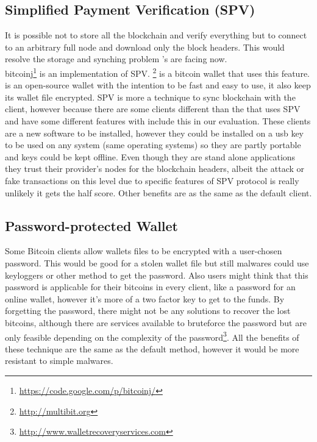 \subsection{Simplified Payment Verification (SPV)}
It is possible not to store all the blockchain and verify everything but to connect to an arbitrary full node and download only the block headers. This would resolve the storage and synching problem \bitcoinclient's are facing now. \\
bitcoinj\footnote{\url {https://code.google.com/p/bitcoinj/}} is an implementation of SPV.
 \multibit \footnote{\url {http://multibit.org}} is a bitcoin wallet that uses this feature. \multibit is an open-source wallet with the intention to be fast and easy to use, it also keep its wallet file encrypted.
SPV is more a technique to sync blockchain with the client, however because there are some clients different than the \bitcoinclient that uses SPV and have some different features with include this in our evaluation.
These clients are a new software to be installed, however they could be installed on a usb key to be used on any system (same operating systems) so they are partly portable and keys could be kept offline. Even though they are stand alone applications they trust their provider's nodes for the blockchain headers, albeit the attack or fake transactions on this level due to specific features of SPV protocol is really unlikely it gets the half score. Other benefits are as the same as the default client.




\subsection{Password-protected Wallet}
Some Bitcoin clients allow wallets files to be encrypted with a user-chosen password. This would be good for a stolen wallet file but still malwares could use keyloggers or other method to get the password. Also users might think that this password is applicable for their bitcoins in every client, like a password for an online wallet, however it's more of a two factor key to get to the funds. By forgetting the password, there might not be any solutions to recover the lost bitcoins, although there are services available to bruteforce the password but are only feasible depending on the complexity of the password\footnote{\url {http://www.walletrecoveryservices.com}}. All the benefits of these technique are the same as the default method, however it would be more resistant to simple malwares.

